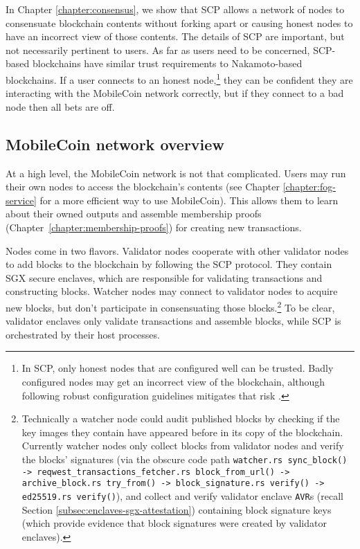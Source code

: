 In Chapter \ref{chapter:consensus}, we show that SCP allows a network of nodes to consensuate blockchain contents without forking apart or causing honest nodes to have an incorrect view of those contents. The details of SCP are important, but not necessarily pertinent to users. As far as users need to be concerned, SCP-based blockchains have similar trust requirements to Nakamoto-based blockchains. If a user connects to an honest node,\footnote{In SCP, only honest nodes that are configured well can be trusted. Badly configured nodes may get an incorrect view of the blockchain, although following robust configuration guidelines mitigates that risk \cite{fast-secure-global-payments-stellar}.} they can be confident they are interacting with the MobileCoin network correctly, but if they connect to a bad node then all bets are off.


\subsection{MobileCoin network overview}
\label{subsec:blockchain-network-overview}

At a high level, the MobileCoin network is not that complicated. Users may run their own nodes to access the blockchain's contents (see Chapter \ref{chapter:fog-service} for a more efficient way to use MobileCoin). This allows them to learn about their owned outputs and assemble membership proofs (Chapter~\ref{chapter:membership-proofs}) for creating new transactions. 

Nodes come in two flavors. Validator nodes cooperate with other validator nodes to add blocks to the blockchain by following the SCP protocol. They contain SGX secure enclaves, which are responsible for validating transactions and constructing blocks. Watcher nodes may connect to validator nodes to acquire new blocks, but don't participate in consensuating those blocks.\footnote{Technically a watcher node could audit published blocks by checking if the key images they contain have appeared before in its copy of the blockchain. Currently watcher nodes only collect blocks from validator nodes and verify the blocks' signatures (via the obscure code path {\tt watcher.rs sync\_block() -> reqwest\_transactions\_fetcher.rs block\_from\_url() -> archive\_block.rs try\_from() -> block\_signature.rs verify() -> ed25519.rs verify()}), and collect and verify validator enclave {\tt AVR}s (recall Section \ref{subsec:enclaves-sgx-attestation}) containing block signature keys (which provide evidence that block signatures were created by validator enclaves).} To be clear, validator enclaves only validate transactions and assemble blocks, while SCP is orchestrated by their host processes.

